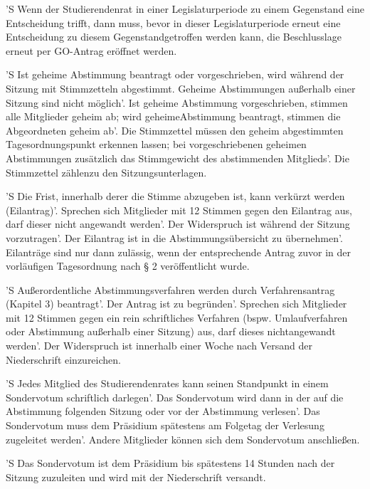 \documentclass[fontsize=12pt,parskip=half, ref=short]{scrartcl}
\begin{document}
\begin{contract}
  'S Wenn der Studierendenrat in einer Legislaturperiode zu einem Gegenstand
  eine Entscheidung trifft, dann muss, bevor in dieser Legislaturperiode erneut
  eine Entscheidung zu diesem Gegenstandgetroffen werden kann, die Beschlusslage
  erneut per GO-Antrag eröffnet werden.

  \label{Par:AusAbstimmv}
  'S Ist geheime Abstimmung beantragt oder vorgeschrieben, wird während der
  Sitzung mit Stimmzetteln abgestimmt. Geheime Abstimmungen außerhalb einer
  Sitzung sind nicht möglich'. Ist geheime Abstimmung vorgeschrieben, stimmen
  alle Mitglieder geheim ab; wird geheimeAbstimmung beantragt, stimmen die
  Abgeordneten geheim ab'. Die Stimmzettel müssen den geheim abgestimmten
  Tagesordnungspunkt erkennen lassen; bei vorgeschriebenen geheimen Abstimmungen
  zusätzlich das Stimmgewicht des abstimmenden Mitglieds'. Die Stimmzettel
  zählenzu den Sitzungsunterlagen.

  'S Die Frist, innerhalb derer die Stimme abzugeben ist, kann verkürzt werden
  (Eilantrag)'. Sprechen sich Mitglieder mit 12 Stimmen gegen den Eilantrag aus,
  darf dieser nicht angewandt werden'. Der Widerspruch ist während der Sitzung
  vorzutragen'. Der Eilantrag ist in die Abstimmungsübersicht zu übernehmen'.
  Eilanträge sind nur dann zulässig, wenn der entsprechende Antrag zuvor in der
  vorläufigen Tagesordnung nach § 2 veröffentlicht wurde.

  'S Außerordentliche Abstimmungsverfahren werden durch Verfahrensantrag
  (Kapitel 3) beantragt'. Der Antrag ist zu begründen'. Sprechen sich Mitglieder
  mit 12 Stimmen gegen ein rein schriftliches Verfahren (bspw. Umlaufverfahren
  oder Abstimmung außerhalb einer Sitzung) aus, darf dieses nichtangewandt
  werden'. Der Widerspruch ist innerhalb einer Woche nach Versand der
  Niederschrift einzureichen.

  \label{Par:Sonderv}
  'S Jedes Mitglied des Studierendenrates kann seinen Standpunkt in einem
  Sondervotum schriftlich darlegen'. Das Sondervotum wird dann in der auf die
  Abstimmung folgenden Sitzung oder vor der Abstimmung verlesen'. Das
  Sondervotum muss dem Präsidium spätestens am Folgetag der Verlesung zugeleitet
  werden'. Andere Mitglieder können sich dem Sondervotum anschließen.

  'S Das Sondervotum ist dem Präsidium bis spätestens 14 Stunden nach der
  Sitzung zuzuleiten und wird mit der Niederschrift versandt.

\end{contract}
\end{document}
